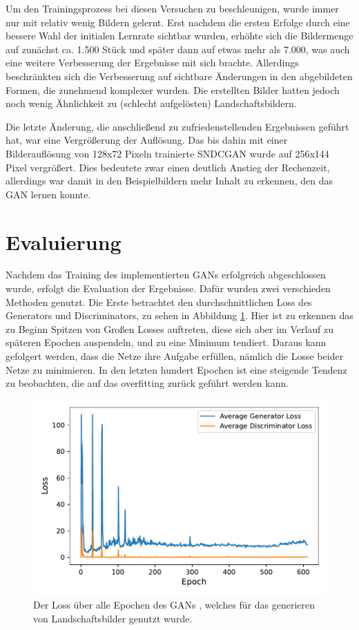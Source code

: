  Um den Trainingsprozess bei diesen Versuchen zu beschleunigen, wurde immer nur
 mit relativ wenig Bildern gelernt. Erst nachdem die ersten Erfolge durch eine
 bessere Wahl der initialen Lernrate sichtbar wurden, erhöhte sich die
 Bildermenge auf zunächst ca. 1.500 Stück und später dann auf etwas mehr als
 7.000, was auch eine weitere Verbesserung der Ergebnisse mit sich brachte.
 Allerdings beschränkten sich die Verbesserung auf sichtbare Änderungen in den
 abgebildeten Formen, die zunehmend komplexer wurden. Die erstellten Bilder
 hatten jedoch noch wenig Ähnlichkeit zu (schlecht aufgelösten)
 Landschaftsbildern.
 
 Die letzte Änderung, die anschließend zu zufriedenstellenden Ergebnissen
 geführt hat, war eine Vergrößerung der Auflösung. Das bis dahin mit einer
 Bilderauflösung von 128x72 Pixeln trainierte SNDCGAN wurde auf 256x144 Pixel
 vergrößert. Dies bedeutete zwar einen deutlich Anstieg der Rechenzeit,
 allerdings war damit in den Beispielbildern mehr Inhalt zu erkennen, den das
 GAN lernen konnte.
 
 \section{Evaluierung}\label{evalGen} Nachdem das Training des implementierten
  GANs erfolgreich abgeschlossen wurde, erfolgt die Evaluation der Ergebnisse.
  Dafür wurden zwei verschieden Methoden genutzt. Die Erste betrachtet den
  durchschnittlichen Loss des Generators und Discriminators, zu sehen in
  Abbildung \ref{fig:plot_losses_gen}.  Hier ist zu erkennen das zu Beginn
  Spitzen von Großen Losses auftreten, diese sich aber im Verlauf zu späteren
  Epochen auspendeln, und zu eine Minimum tendiert. Daraus kann gefolgert
  werden, dass die Netze ihre Aufgabe erfüllen, nämlich die Losse beider Netze
  zu minimieren. In den letzten hundert Epochen ist eine steigende Tendenz zu
  beobachten, die auf das overfitting zurück geführt werden kann.
 
 
 
 
 \begin{figure}[t]
 	\centering
 	\includegraphics[width=0.7\linewidth]{images/plot_line_plot_losses_gen}
 	\caption[Losses des generirenden GANs]{Der Loss über alle Epochen des GANs , welches für das generieren von Landschaftsbilder genutzt wurde.}
 	\label{fig:plot_losses_gen}
 \end{figure}
 

